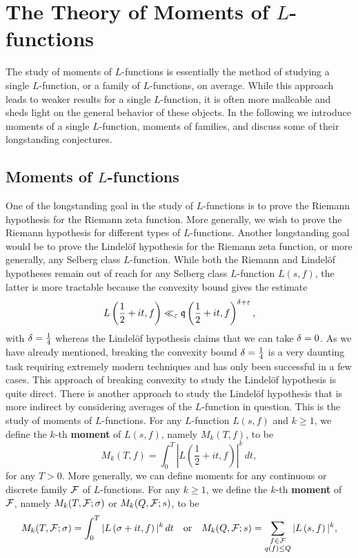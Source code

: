 \chapter{The Theory of Moments of \texorpdfstring{$L$}{L}-functions}
  The study of moments of $L$-functions is essentially the method of studying a single $L$-function, or a family of $L$-functions, on average. While this approach leads to weaker results for a single $L$-function, it is often more malleable and sheds light on the general behavior of these objects. In the following we introduce moments of a single $L$-function, moments of families, and discuss some of their longstanding conjectures.
\section{Moments of \texorpdfstring{$L$}{L}-functions}
  One of the longstanding goal in the study of $L$-functions is to prove the Riemann hypothesis for the Riemann zeta function. More generally, we wish to prove the Riemann hypothesis for different types of $L$-functions. Another longstanding goal would be to prove the Lindel\"of hypothesis for the Riemann zeta function, or more generally, any Selberg class $L$-function. While both the Riemann and Lindel\"of hypotheses remain out of reach for any Selberg class $L$-function $L(s,f)$, the latter is more tractable because the convexity bound gives the estimate
  \[
    L\left(\frac{1}{2}+it,f\right) \ll_{\varepsilon} \mathfrak{q}\left(\frac{1}{2}+it,f\right)^{\delta+\varepsilon},
  \]
  with $\delta = \frac{1}{4}$ whereas the Lindel\"of hypothesis claims that we can take $\delta = 0$. As we have already mentioned, breaking the convexity bound $\delta = \frac{1}{4}$ is a very daunting task requiring extremely modern techniques and has only been successful in a few cases. This approach of breaking convexity to study the Lindel\"of hypothesis is quite direct. There is another approach to study the Lindel\"of hypothesis that is more indirect by considering averages of the $L$-function in question. This is the study of moments of $L$-functions. For any $L$-function $L(s,f)$ and $k \ge 1$, we define the $k$-th \textbf{moment} of $L(s,f)$, namely $M_{k}(T,f)$, to be
  \[
    M_{k}(T,f) = \int_{0}^{T}\left|L\left(\frac{1}{2}+it,f\right)\right|^{k}\,dt,
  \]
  for any $T > 0$. More generally, we can define moments for any continuous or discrete family $\mathcal{F}$ of $L$-functions. For any $k \ge 1$, we define the $k$-th \textbf{moment} of $\mathcal{F}$, namely $M_{k}(T,\mathcal{F};\sigma)$ or $M_{k}(Q,\mathcal{F};s)$, to be
  \[
    M_{k}(T,\mathcal{F};\sigma) = \int_{0}^{T}|L\left(\sigma+it,f\right)|^{k}\,dt \quad \text{or} \quad M_{k}(Q,\mathcal{F};s) = \sum_{\substack{f \in \mathcal{F} \\ q(f) \le Q}}|L\left(s,f\right)|^{k},
  \]
